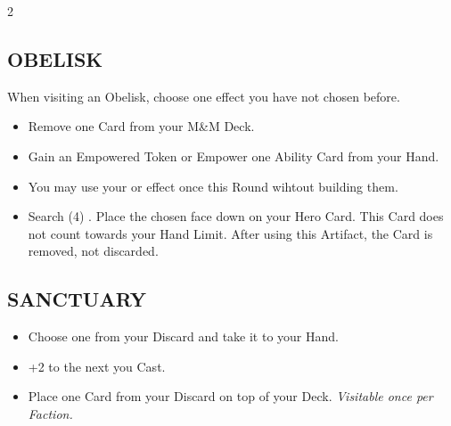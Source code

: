 \begin{multicols*}{2}
\subsection*{\MakeUppercase{Obelisk}}
When visiting an Obelisk, choose one effect you have not chosen before.
\begin{itemize}
  \item Remove one Card from your M\&M Deck.
  \item Gain an Empowered Token or Empower one Ability Card from your Hand.
  \item You may use your  or  effect once this Round wihtout building them.
  \item Search (4) . Place the chosen  face down on your Hero Card. This Card does not count towards your Hand Limit. After using this Artifact, the Card is removed, not discarded.
\end{itemize}

\subsection*{\MakeUppercase{Sanctuary}}
\begin{itemize}
  \item Choose one  from your Discard and take it to your Hand.
  \item +2  to the next  you Cast.
  \item Place one Card from your Discard on top of your Deck. \textit{Visitable once per Faction.}
\end{itemize}

\end{multicols*}
